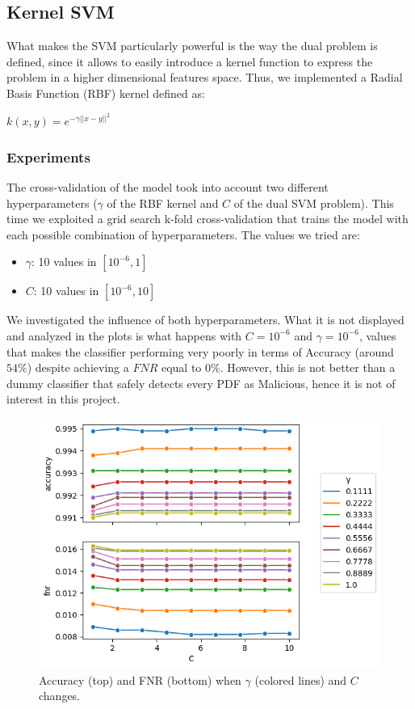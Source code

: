 \documentclass[twocolumn, switch]{article} %
\newcommand\x{0.7}
\begin{document}
\subsection{Kernel SVM}
What makes the SVM particularly powerful is the way the dual problem is defined, since it allows to easily introduce a kernel function to express the problem in a higher dimensional features space. Thus, we implemented a Radial Basis Function (RBF) kernel defined as:
\begin{center}
	$k(x,y) = e^{-\gamma||x-y||^2}$
\end{center}

\subsubsection{Experiments}
\label{sub:expsvm}
The cross-validation of the model took into account two different hyperparameters ($\gamma$ of the RBF kernel and $C$ of the dual SVM problem).
This time we exploited a grid search k-fold cross-validation that trains the model with each possible combination of hyperparameters. The values we tried are:
\begin{itemize}
	\item $\gamma$: 10 values in $[10^{-6}, 1]$
	\item $C$: 10 values in $[10^{-6}, 10]$
\end{itemize}
We investigated the influence of both hyperparameters. What it is not displayed and analyzed in the plots is what happens with $C=10^{-6}$ and $\gamma=10^{-6}$, values that makes the classifier performing very poorly in terms of Accuracy (around $54\%$) despite achieving a $FNR$ equal to $0\%$. However, this is not better than a dummy classifier that safely detects every PDF as Malicious, hence it is not of interest in this project.

\begin{figure}[ht!]
	\centering
	\includegraphics[width=\x\linewidth]{rbf_svm_gamma_accuracy_fnr.png}
	\caption{Accuracy (top) and FNR (bottom) when $\gamma$ (colored lines) and $C$ changes.}
	\label{fig:rbfsvmgamma}
\end{figure}
\end{document}
